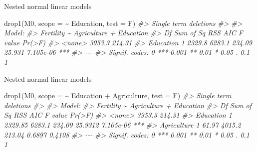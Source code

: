 \documentclass[
  10pt,
  ignorenonframetext,
]{beamer}
\newenvironment{Shaded}{\begin{snugshade}}{\end{snugshade}}
\newcommand{\AttributeTok}[1]{\textcolor[rgb]{0.77,0.63,0.00}{#1}}
\newcommand{\CommentTok}[1]{\textcolor[rgb]{0.56,0.35,0.01}{\textit{#1}}}
\newcommand{\FunctionTok}[1]{\textcolor[rgb]{0.00,0.00,0.00}{#1}}
\newcommand{\NormalTok}[1]{#1}
\newcommand{\SpecialCharTok}[1]{\textcolor[rgb]{0.00,0.00,0.00}{#1}}
\newcommand{\StringTok}[1]{\textcolor[rgb]{0.31,0.60,0.02}{#1}}
\begin{document}
\begin{frame}[fragile]{Nested normal linear models}
\protect\hypertarget{nested-normal-linear-models-6}{}
\begin{Shaded}
\begin{Highlighting}[]
\FunctionTok{drop1}\NormalTok{(M0, }\AttributeTok{scope =} \SpecialCharTok{\textasciitilde{}}\NormalTok{ Education, }\AttributeTok{test =} \StringTok{\textquotesingle{}F\textquotesingle{}}\NormalTok{)}
\CommentTok{\#\textgreater{} Single term deletions}
\CommentTok{\#\textgreater{} }
\CommentTok{\#\textgreater{} Model:}
\CommentTok{\#\textgreater{} Fertility \textasciitilde{} Agriculture + Education}
\CommentTok{\#\textgreater{}           Df Sum of Sq    RSS    AIC F value    Pr(\textgreater{}F)    }
\CommentTok{\#\textgreater{} \textless{}none\textgreater{}                 3953.3 214.31                      }
\CommentTok{\#\textgreater{} Education  1    2329.8 6283.1 234.09  25.931 7.105e{-}06 ***}
\CommentTok{\#\textgreater{} {-}{-}{-}}
\CommentTok{\#\textgreater{} Signif. codes:  0 \textquotesingle{}***\textquotesingle{} 0.001 \textquotesingle{}**\textquotesingle{} 0.01 \textquotesingle{}*\textquotesingle{} 0.05 \textquotesingle{}.\textquotesingle{} 0.1 \textquotesingle{} \textquotesingle{} 1}
\end{Highlighting}
\end{Shaded}
\end{frame}

\begin{frame}[fragile]{Nested normal linear models}
\protect\hypertarget{nested-normal-linear-models-7}{}
\begin{Shaded}
\begin{Highlighting}[]
\FunctionTok{drop1}\NormalTok{(M0, }\AttributeTok{scope =} \SpecialCharTok{\textasciitilde{}}\NormalTok{ Education }\SpecialCharTok{+}\NormalTok{ Agriculture, }\AttributeTok{test =} \StringTok{\textquotesingle{}F\textquotesingle{}}\NormalTok{)}
\CommentTok{\#\textgreater{} Single term deletions}
\CommentTok{\#\textgreater{} }
\CommentTok{\#\textgreater{} Model:}
\CommentTok{\#\textgreater{} Fertility \textasciitilde{} Agriculture + Education}
\CommentTok{\#\textgreater{}             Df Sum of Sq    RSS    AIC F value    Pr(\textgreater{}F)    }
\CommentTok{\#\textgreater{} \textless{}none\textgreater{}                   3953.3 214.31                      }
\CommentTok{\#\textgreater{} Education    1   2329.85 6283.1 234.09 25.9312 7.105e{-}06 ***}
\CommentTok{\#\textgreater{} Agriculture  1     61.97 4015.2 213.04  0.6897    0.4108    }
\CommentTok{\#\textgreater{} {-}{-}{-}}
\CommentTok{\#\textgreater{} Signif. codes:  0 \textquotesingle{}***\textquotesingle{} 0.001 \textquotesingle{}**\textquotesingle{} 0.01 \textquotesingle{}*\textquotesingle{} 0.05 \textquotesingle{}.\textquotesingle{} 0.1 \textquotesingle{} \textquotesingle{} 1}
\end{Highlighting}
\end{Shaded}
\end{frame}
\end{document}
